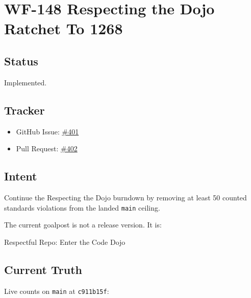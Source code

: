 \chapter{WF-148 Respecting the Dojo Ratchet To 1268}\label{record-230}

\smallskip

\section{Status}\label{record-230-status}

Implemented.

\section{Tracker}\label{record-230-tracker}

\begin{itemize}
\tightlist
\item
  GitHub Issue: \href{https://github.com/flyingrobots/bijou/issues/401}{\#401}
\item
  Pull Request: \href{https://github.com/flyingrobots/bijou/pull/402}{\#402}
\end{itemize}

\section{Intent}\label{record-230-intent}

Continue the Respecting the Dojo burndown by removing at least 50 counted standards violations from the landed \texttt{m\allowbreak{}a\allowbreak{}i\allowbreak{}n} ceiling.

The current goalpost is not a release version. It is:

\begin{CodeBlock}
Respectful Repo: Enter the Code Dojo
\end{CodeBlock}

\section{Current Truth}\label{record-230-current-truth}

Live counts on \texttt{m\allowbreak{}a\allowbreak{}i\allowbreak{}n} at \texttt{c\allowbreak{}9\allowbreak{}1\allowbreak{}1\allowbreak{}b\allowbreak{}1\allowbreak{}5\allowbreak{}f}:

